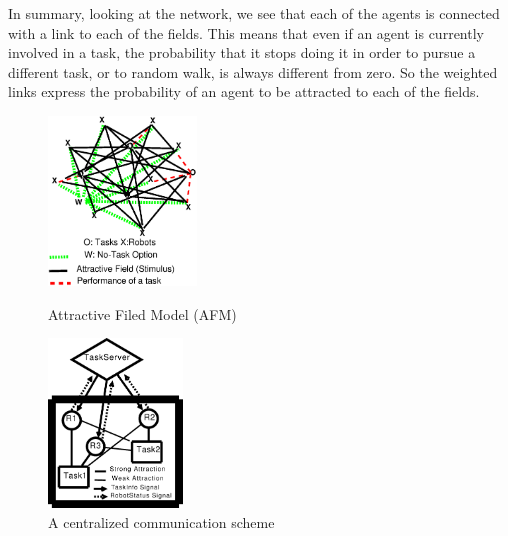 \documentclass{llncs}
\begin{document}
In summary, looking at the network, we see that each of the agents is connected with a link to each of the fields. This means that even if an agent is currently involved in a task, the probability that it stops doing it in order to pursue a different task, or to random walk, is always different from zero. So the weighted links express the probability of an agent to be attracted to each of the fields.\\
\begin{figure}
\begin{minipage}[t]{0.48\linewidth}
\centering
\includegraphics[height=4.5cm, angle=0]{../dia-files/AFM-Diag2.eps}
\caption{\small Attractive Filed Model (AFM)}
\label{fig:afm} %
\end{minipage}
\hspace{0.5cm}
\begin{minipage}[t]{0.48\linewidth}
\centering
\includegraphics[height=4.5cm, angle=0]{../dia-files/CentralizedComm.eps}
\caption{\small A centralized communication scheme} %
\label{fig:ccm} %
\end{minipage}
\end{figure}
\end{document}
